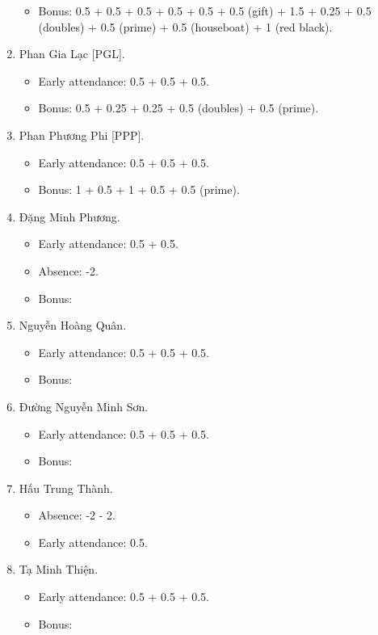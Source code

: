 \documentclass{article}
\begin{document}
\begin{enumerate}
\begin{itemize}
		\item Bonus: 0.5 + 0.5 + 0.5 + 0.5 + 0.5 + 0.5 (gift) + 1.5 + 0.25 + 0.5 (doubles) + 0.5 (prime) + 0.5 (houseboat) + 1 (red black).
	\end{itemize}
	\item {\sc Phan Gia Lạc [PGL].}
	\begin{itemize}
		\item Early attendance: 0.5 + 0.5 + 0.5.
		\item Bonus: 0.5 + 0.25 + 0.25 + 0.5 (doubles) + 0.5 (prime).
	\end{itemize}
	\item {\sc Phan Phương Phi [PPP].}
	\begin{itemize}
		\item Early attendance: 0.5 + 0.5 + 0.5.
		\item Bonus: 1 + 0.5 + 1 + 0.5 + 0.5 (prime).
	\end{itemize}
	\item {\sc Đặng Minh Phương.}
	\begin{itemize}
		\item Early attendance: 0.5 + 0.5.
		\item Absence: -2.
		\item Bonus: 
	\end{itemize}
	\item {\sc Nguyễn Hoàng Quân.}
	\begin{itemize}
		\item Early attendance: 0.5 + 0.5 + 0.5.
		\item Bonus: 
	\end{itemize}
	\item {\sc Đường Nguyễn Minh Sơn.}
	\begin{itemize}
		\item Early attendance: 0.5 + 0.5 + 0.5.
		\item Bonus: 
	\end{itemize}
	\item {\sc Hấu Trung Thành.}
	\begin{itemize}
		\item Absence: -2 - 2.
		\item Early attendance: 0.5.
	\end{itemize}
	\item {\sc Tạ Minh Thiện.}
	\begin{itemize}
		\item Early attendance: 0.5 + 0.5 + 0.5.
		\item Bonus: 
	\end{itemize}

\end{enumerate}
\end{document}
